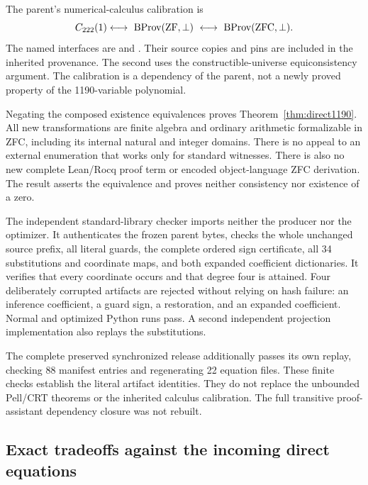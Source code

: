 The parent's numerical-calculus calibration is
\[
 C_{222}(1) \longleftrightarrow\
 \operatorname{BProv}(\mathrm{ZF},\bot)
 \ \longleftrightarrow\
 \operatorname{BProv}(\mathrm{ZFC},\bot).
\]
The named interfaces are
 and
.
Their source copies and pins are included in the inherited provenance.
The second uses the constructible-universe equiconsistency argument.
The calibration is a dependency of the parent, not a newly proved
property of the 1190-variable polynomial.

Negating the composed existence equivalences proves
Theorem~\ref{thm:direct1190}. All new transformations are finite algebra
and ordinary arithmetic formalizable in ZFC, including its internal
natural and integer domains. There is no appeal to an external
enumeration that works only for standard witnesses. There is also no
new complete Lean/Rocq proof term or encoded object-language ZFC
derivation. The result asserts the equivalence and proves neither
consistency nor existence of a zero.

The independent standard-library checker imports neither the producer
nor the optimizer. It authenticates the frozen parent bytes, checks the
whole unchanged source prefix, all literal guards, the complete ordered
sign certificate, all 34 substitutions and coordinate maps, and both
expanded coefficient dictionaries. It verifies that every coordinate
occurs and that degree four is attained. Four deliberately corrupted
artifacts are rejected without relying on hash failure: an inference
coefficient, a guard sign, a restoration, and an expanded coefficient.
Normal and optimized Python runs pass. A second independent projection
implementation also replays the substitutions.

The complete preserved synchronized release additionally passes its own
replay, checking 88 manifest entries and regenerating 22 equation files.
These finite checks establish the literal artifact identities. They do
not replace the unbounded Pell/CRT theorems or the inherited calculus
calibration. The full transitive proof-assistant dependency closure was
not rebuilt.

\subsection{Exact tradeoffs against the incoming direct equations}

